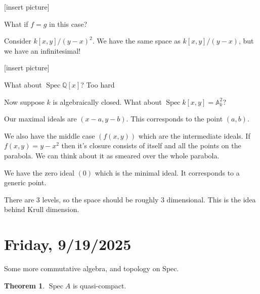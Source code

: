 \documentclass{article}
\theoremstyle{definition}
\newtheorem{theorem}{Theorem}
\begin{document}
    [insert picture]

    What if \(f=g\) in this case?

    Consider \(k[x,y] / (y-x)^2\). We have the same space as \(k[x,y] / (y-x)\), but we have an infinitesimal!
    
    [insert picture]

    What about \(\operatorname{Spec} \mathbb{Q} [x]\)? Too hard

    Now suppose \(k\) is algebraically closed. What about \(\operatorname{Spec} k[x,y] = \mathbb{A}^2_k\)?

    Our maximal ideals are \((x-a, y-b)\). This corresponds to the point \((a,b)\).

    We also have the middle case \((f(x,y))\) which are the intermediate ideals. If \(f(x,y) = y - x^2\) then it's closure consists of itself and all the points on the parabola. We can think about it as smeared over the whole parabola.

    We have the zero ideal \((0)\) which is the minimal ideal. It corresponds to a generic point.

    There are \(3\) levels, so the space should be roughly \(3\) dimensional. This is the idea behind Krull dimension.

    \section*{Friday, 9/19/2025}
    
    Some more commutative algebra, and topology on Spec.

    \begin{theorem}
        \(\operatorname{Spec} A\) is quasi-compact. 
    \end{theorem}
\end{document}
